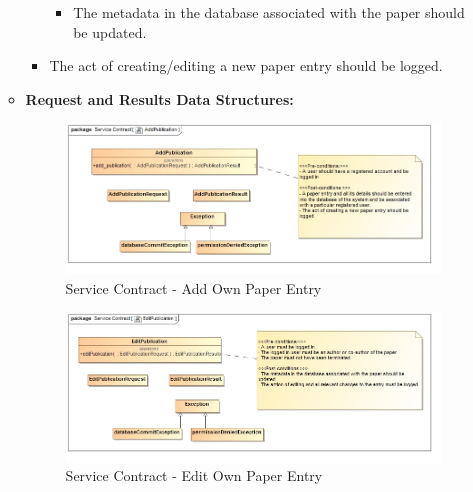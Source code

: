 \documentclass{article}
\begin{document}
\begin{itemize}
\begin{itemize}
\begin{itemize}
\begin{itemize}
								\item The metadata in the database associated with the paper should be updated.
							\end{itemize}													
							\item The act of creating/editing a new paper entry should be logged.
						\end{itemize}
						\item \textbf{Request and Results Data Structures:}
						\begin{figure}[H]
							\includegraphics[width=\linewidth]{../Diagrams/ServiceContracts/Publication subsystem/AddPublication.jpg}
							\caption{Service Contract - Add Own Paper Entry}
						\end{figure}
						\begin{figure}[H]
							\includegraphics[width=\linewidth]{../Diagrams/ServiceContracts/Publication subsystem/EditPublication.jpg}
							\caption{Service Contract - Edit Own Paper Entry}
						\end{figure}
					\end{itemize}
					

\end{itemize}
\end{document}
